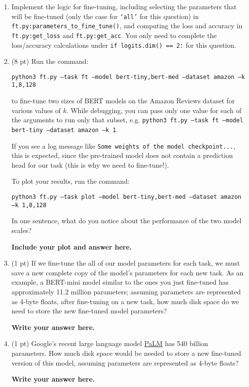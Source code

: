 \documentclass[12pt]{article}
\begin{document}
\begin{enumerate}
    \item Implement the logic for fine-tuning, including selecting the parameters that will be fine-tuned (only the case for \texttt{`all'} for this question) in \texttt{ft.py:\allowbreak parameters\_to\allowbreak \_fine\_tune()}, and computing the loss and accuracy in \texttt{ft.py:\allowbreak get\_loss} and \texttt{ft.py:\allowbreak get\_acc}. You only need to complete the loss/accuracy calculations under \texttt{if logits.dim() == 2:} for this question.
    \item (8 pt) Run the command:
    
    {\small\texttt{python3 ft.py --task ft --model bert-tiny,bert-med --dataset amazon --k 1,8,128}}
    
    to fine-tune two sizes of BERT models on the Amazon Reviews dataset for various values of $k$. While debugging, you can pass only one value for each of the arguments to run only that subset, e.g. \texttt{python3 ft.py --task ft --model bert-tiny --dataset amazon --k 1}.
    
    If you see a log message like \texttt{Some weights of the model checkpoint...}, this is expected, since the pre-trained model does not contain a prediction head for our task (this is why we need to fine-tune!).

    To plot your results, run the command:
    
    {\small\texttt{python3 ft.py --task plot --model bert-tiny,bert-med --dataset amazon --k 1,8,128}}
    
    In one sentence, what do you notice about the performance of the two model scales?
    
    \textbf{\color{red}Include your plot and answer here.}

    \item (1 pt) If we fine-tune the all of our model parameters for each task, we must save a new complete copy of the model's parameters for each new task. As an example, a BERT-mini model similar to the ones you just fine-tuned has approximately 11.2 million parameters; assuming parameters are represented as 4-byte floats, after fine-tuning on a new task, how much disk space do we need to store the new fine-tuned model parameters?

    \textbf{\color{red} Write your answer here.}

    \item (1 pt) Google's recent large language model \href{https://storage.googleapis.com/pathways-language-model/PaLM-paper.pdf}{PaLM} has 540 billion parameters. How much disk space would be needed to store a new fine-tuned version of this model, assuming parameters are represented as 4-byte floats?

    \textbf{\color{red} Write your answer here.}

\end{enumerate}
\end{document}
